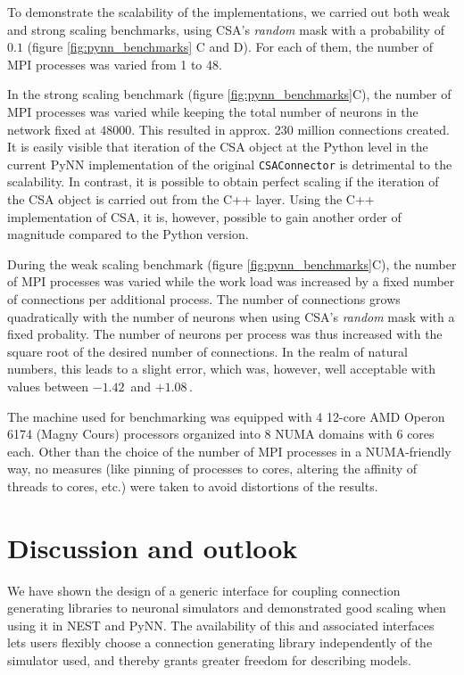 \documentclass{frontiersSCNS} %
\newcommand{\permil}{\,\textperthousand\xspace}
\begin{document}
To demonstrate the scalability of the implementations, we carried out
both weak and strong scaling benchmarks, using CSA's \emph{random}
mask with a probability of $0.1$ (figure \ref{fig:pynn_benchmarks} C and
D). For each of them, the number of MPI processes was varied from 1 to
48.

In the strong scaling benchmark (figure \ref{fig:pynn_benchmarks}C),
the number of MPI processes was varied while keeping the total number
of neurons in the network fixed at $48000$. This resulted in
approx. 230 million connections created. It is easily visible that
iteration of the CSA object at the Python level in the current PyNN
implementation of the original \verb|CSAConnector| is detrimental to
the scalability. In contrast, it is possible to obtain perfect scaling
if the iteration of the CSA object is carried out from the C++
layer. Using the C++ implementation of CSA, it is, however, possible
to gain another order of magnitude compared to the Python version.

During the weak scaling benchmark (figure \ref{fig:pynn_benchmarks}C),
the number of MPI processes was varied while the work load was
increased by a fixed number of connections per additional process.
The number of connections grows quadratically with the number of
neurons when using CSA's \emph{random} mask with a fixed
probality. The number of neurons per process was thus increased with
the square root of the desired number of connections. In the realm of
natural numbers, this leads to a slight error, which was, however,
well acceptable with values between $-1.42$\permil and $+1.08$\permil.

The machine used for benchmarking was equipped with 4 12-core AMD
Operon 6174 (Magny Cours) processors organized into 8 NUMA domains
with 6 cores each. Other than the choice of the number of MPI
processes in a NUMA-friendly way, no measures (like pinning of
processes to cores, altering the affinity of threads to cores, etc.)
were taken to avoid distortions of the results.


\section{Discussion and outlook}

We have shown the design of a generic interface for coupling
connection generating libraries to neuronal simulators and
demonstrated good scaling when using it in NEST and PyNN. The
availability of this and associated interfaces lets users flexibly
choose a connection generating library independently of the simulator
used, and thereby grants greater freedom for describing models.
\end{document}
